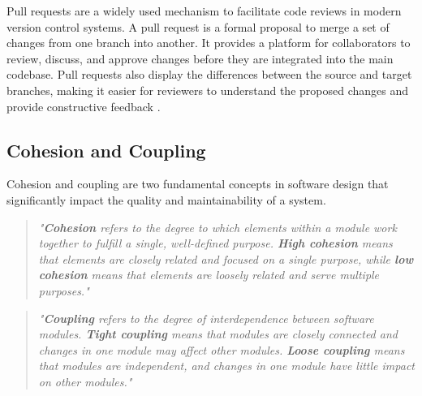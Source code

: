 {Pull requests are a widely used mechanism to facilitate code reviews in modern version control systems. A pull request is a formal proposal to merge a set of changes from one branch into another. It provides a platform for collaborators to review, discuss, and approve changes before they are integrated into the main codebase. Pull requests also display the differences between the source and target branches, making it easier for reviewers to understand the proposed changes and provide constructive feedback \cite{github:pr}.

\subsection{Cohesion and Coupling}
\label{subsec:cohesion-and-coupling}

Cohesion and coupling are two fundamental concepts in software design that significantly impact the quality and maintainability of a system. \\

\begin{quote}
\textit{"\textbf{Cohesion} refers to the degree to which elements within a module work together to fulfill a single, well-defined purpose. \textbf{High cohesion} means that elements are closely related and focused on a single purpose, while \textbf{low cohesion} means that elements are loosely related and serve multiple purposes."} \cite{geeksforgeeks:c&c} \\
\end{quote}

\begin{quote}
\textit{"\textbf{Coupling} refers to the degree of interdependence between software modules. \textbf{Tight coupling} means that modules are closely connected and changes in one module may affect other modules. \textbf{Loose coupling} means that modules are independent, and changes in one module have little impact on other modules."} \cite{geeksforgeeks:c&c} \\
\end{quote}

}
